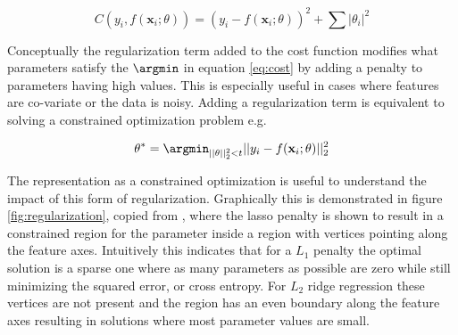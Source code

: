 \begin{equation}\label{eq:mse_ridge}
C(y_i, f(\mathbf{x}_i; \theta)) = (y_i - f(\mathbf{x}_i; \theta))^2 + \sum|\theta_i|^2
\end{equation}

\noindent Conceptually the regularization term added to the cost function modifies what parameters satisfy the $\argmin$ in equation \ref{eq:cost} by adding a penalty to parameters having high values. This is especially useful in cases where features are co-variate or the data is noisy. Adding a regularization term is equivalent to solving a constrained optimization problem e.g. 

\begin{align}
\theta^* = \argmin_{||\theta||_2^2<t} ||y_i - f(\mathbf{x}_i; \theta)||_2^2
\end{align}

\noindent The representation as a constrained optimization is useful to understand the impact of this form of regularization. Graphically this is demonstrated in figure \ref{fig:regularization}, copied from \cite{Mehta2019}, where the lasso penalty is shown to result in a constrained region for the parameter inside a region with vertices pointing along the feature axes. Intuitively this indicates that for a $L_1$ penalty the optimal solution is a sparse one where as many parameters as possible are zero while still minimizing the squared error, or cross entropy. For $L_2$ ridge regression these vertices are not present and the region has an even boundary along the feature axes resulting in solutions where most parameter values are small.  

